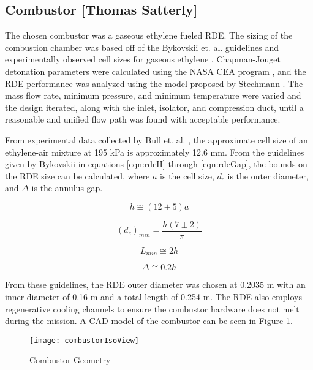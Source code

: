 \subsection{Combustor [Thomas Satterly]}
The chosen combustor was a gaseous ethylene fueled RDE. The sizing of the combustion chamber was based off of the Bykovskii et. al.\cite{bykovskii} guidelines and experimentally observed cell sizes for gaseous ethylene \cite{cellsize}. Chapman-Jouget detonation parameters were calculated using the NASA CEA program \cite{cea}, and the RDE performance was analyzed using the model proposed by Stechmann \cite{stechmann}. The mass flow rate, minimum pressure, and minimum temperature were varied and the design iterated, along with the inlet, isolator, and compression duct, until a reasonable and unified flow path was found with acceptable performance. 

From experimental data collected by Bull et. al. \cite{cellsize}, the approximate cell size of an ethylene-air mixture at 195 kPa is approximately 12.6 mm. From the guidelines given by Bykovskii in equations \ref{eqn:rdeH} through \ref{eqn:rdeGap}, the bounds on the RDE size can be calculated, where $a$ is the cell size, $d_c$ is the outer diameter, and $\Delta$ is the annulus gap.

\begin{equation}
h\cong(12\pm5)a
\label{eqn:rdeH}
\end{equation}

\begin{equation}
(d_c)_{min}=\frac{h(7\pm2)}{\pi}
\label{eqn:rdeDia}
\end{equation}

\begin{equation}
L_{min}\cong2h
\label{eqn:rdeLength}
\end{equation}

\begin{equation}
\Delta\cong0.2h
\label{eqn:rdeGap}
\end{equation}

    From these guidelines, the RDE outer diameter was chosen at 0.2035 m with an inner diameter of 0.16 m and a total length of 0.254 m. The RDE also employs regenerative cooling channels to ensure the combustor hardware does not melt during the mission. A CAD model of the combustor can be seen in Figure \ref{fig:combustorIsoView}.

\begin{figure}[H]
\begin{center}
\texttt{[image: combustorIsoView]}
\caption{Combustor Geometry}
\label{fig:combustorIsoView}
\end{center}
\end{figure}

